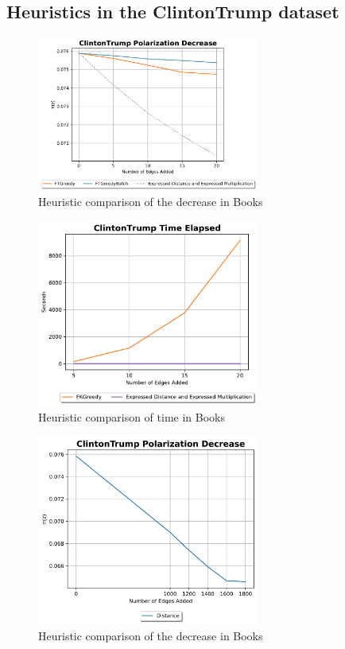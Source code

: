 \subsection{Heuristics in the ClintonTrump dataset}
\begin{figure}[H]
	\centering
	\includegraphics[width=0.65\textwidth]{Figures/ClintonTrump Polarization Decrease}
	\caption{Heuristic comparison of the decrease in Books}
	\label{fig:ClintonTrump_pol}
\end{figure}


\begin{figure}[H]
	\centering
	\includegraphics[width=0.65\textwidth]{Figures/ClintonTrump Time Elapsed}
	\caption{Heuristic comparison of time in Books}
	\label{fig:ClintonTrump_time}
\end{figure}
\clearpage

\begin{figure}[H]
	\centering
	\includegraphics[width=0.65\textwidth]{Figures/ClintonTrump Polarization Decrease 2}
	\caption{Heuristic comparison of the decrease in Books}
	\label{fig:ClintonTrump_pol}
\end{figure}


